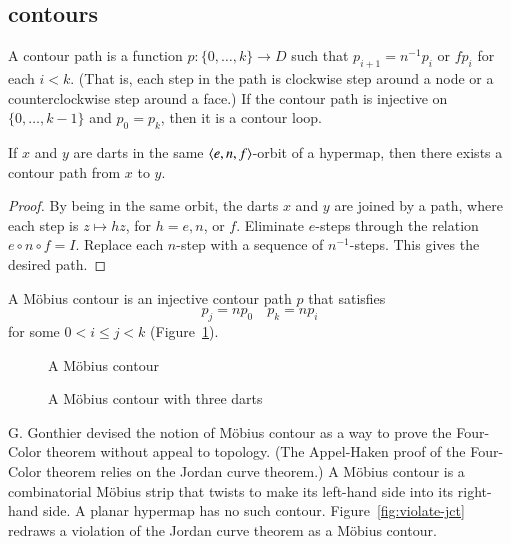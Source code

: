 \subsection{contours}

\begin{definition}  A contour path is a function $p:\{0,\ldots,k\}\to D$
such that $p_{i+1} =
n^{-1} p_i$ or $f p_i$ for each $i<k$.  (That is, each
step in the path is clockwise step around a node or a
counterclockwise step around a face.)   If the contour path
is injective on $\{0,\ldots,k-1\}$
and  $p_0 = p_k$, then it is a contour loop.
\end{definition}

\begin{lemma}\label{lemma:connect-contour}  If $x$ and $y$ are darts
in the same $\langle e,n,f\rangle$-orbit of a hypermap, then there exists
a contour path from $x$ to $y$.
\end{lemma}

\begin{proof} 
By being in the same orbit, the darts
$x$ and $y$ are joined by a path, where each step
is $z\mapsto h z$, for $h=e,n$, or $f$.  Eliminate $e$-steps
through the relation $e\circ
n\circ f = I$.   Replace each $n$-step with a sequence of
$n^{-1}$-steps.  This gives the desired path.
\end{proof}

\begin{definition} A M\"obius contour is an
injective contour path $p$ that satisfies
    \begin{equation}
    \label{eqn:mobius}
    p_j = n p_0\quad p_k = n p_i
    \end{equation}
for some $0 < i\le j< k$ (Figure~\ref{fig:mobius}).
\end{definition}

\begin{figure}[htb]
  \centering
  \caption{A M\"obius contour}
  \label{fig:mobius}
\end{figure}

\begin{figure}[htb]
  \centering
  \caption{A M\"obius contour with three darts}
  \label{fig:3m}
\end{figure}


\begin{remark}
G. Gonthier devised the notion of M\"obius contour
as a way to prove the Four-Color theorem without appeal
to topology.  (The Appel-Haken
proof of the Four-Color theorem relies on the Jordan
curve theorem.)  A M\"obius contour is a 
combinatorial M\"obius strip that
twists to make 
its left-hand side into
its right-hand side.  A planar hypermap has no such contour.  
Figure~\ref{fig:violate-jct}
redraws a violation of the Jordan curve theorem
as a M\"obius contour.   
\end{remark}

